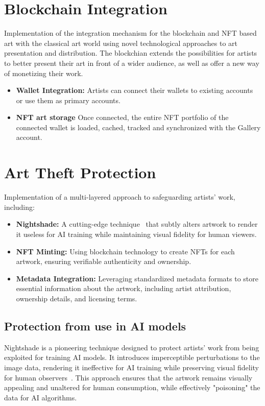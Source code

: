 \section{Blockchain Integration}
Implementation of the integration mechanism for the blockchain and NFT based art with the classical art world using novel technological approaches to art presentation and distribution. The blockchian extends the possibilities for artists to better present their art in front of a wider audience, as well as offer a new way of monetizing their work.

    \begin{itemize}
        \item \textbf{Wallet Integration:} Artists can connect their wallets to existing accounts or use them as primary accounts.
        \item \textbf{NFT art storage} Once connected, the entire NFT portfolio of the connected wallet is loaded, cached, tracked and synchronized with the Gallery account.
    \end{itemize}

\section{Art Theft Protection}
Implementation of a multi-layered approach to safeguarding artists' work, including:

    \begin{itemize}
        \item \textbf{Nightshade:} A cutting-edge technique~\cite{shan2024nightshade} that subtly alters artwork to render it useless for AI training while maintaining visual fidelity for human viewers.
        \item \textbf{NFT Minting:} Using blockchain technology to create NFTs for each artwork, ensuring verifiable authenticity and ownership.
        \item \textbf{Metadata Integration:} Leveraging standardized metadata formats to store essential information about the artwork, including artist attribution, ownership details, and licensing terms.
    \end{itemize}

\subsection{Protection from use in AI models}

Nightshade is a pioneering technique designed to protect artists' work from being exploited for training AI models. It introduces imperceptible perturbations to the image data, rendering it ineffective for AI training while preserving visual fidelity for human observers~\cite{shan2024nightshade}. This approach ensures that the artwork remains visually appealing and unaltered for human consumption, while effectively "poisoning" the data for AI algorithms.

